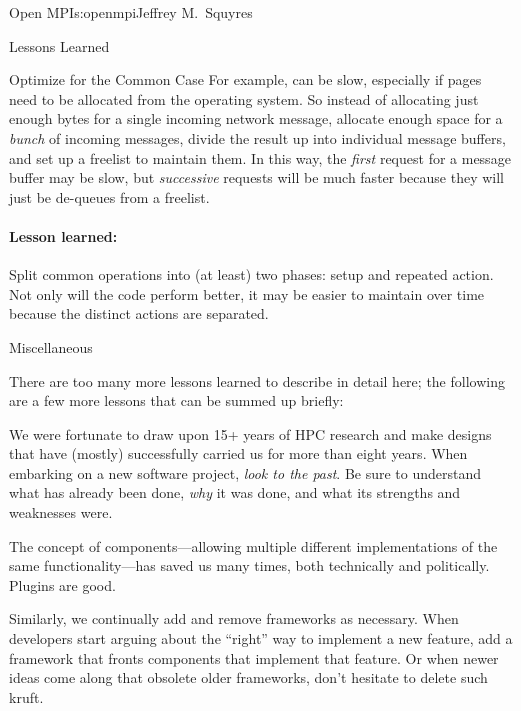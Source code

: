 \begin{aosachapter}{Open MPI}{s:openmpi}{Jeffrey M.\ Squyres}
\begin{aosasect1}{Lessons Learned}
\begin{aosasect2}{Optimize for the Common Case}
For example,  can be slow, especially if pages need to
be allocated from the operating system.  So instead of allocating just
enough bytes for a single incoming network message, allocate enough
space for a \emph{bunch} of incoming messages, divide the result up
into individual message buffers, and set up a freelist to maintain
them.  In this way, the \emph{first} request for a message buffer may
be slow, but \emph{successive} requests will be much faster because
they will just be de-queues from a freelist.


\paragraph{Lesson learned:}

Split common operations into (at least)
two phases: setup and repeated action.  Not only will the code perform
better, it may be easier to maintain over time because the distinct
actions are separated.

\end{aosasect2}


\begin{aosasect2}{Miscellaneous}

There are too many more lessons learned to describe in detail here;
the following are a few more lessons that can be summed up briefly:

\begin{aosaitemize}
\item We were fortunate to draw upon 15+ years of HPC research and
  make designs that have (mostly) successfully carried us for more
  than eight years.  When embarking on a new software project,
  \emph{look to the past}.  Be sure to understand what has already
  been done, \emph{why} it was done, and what its strengths and
  weaknesses were.

\item The concept of components---allowing multiple different
  implementations of the same functionality---has saved us many
  times, both technically and politically.  Plugins are good.

\item Similarly, we continually add and remove frameworks as
  necessary.  When developers start arguing about the ``right'' way to
  implement a new feature, add a framework that fronts components that
  implement that feature.  Or when newer ideas come along that
  obsolete older frameworks, don't hesitate to delete such kruft.


\end{aosaitemize}
\end{aosasect2}
\end{aosasect1}
\end{aosachapter}
